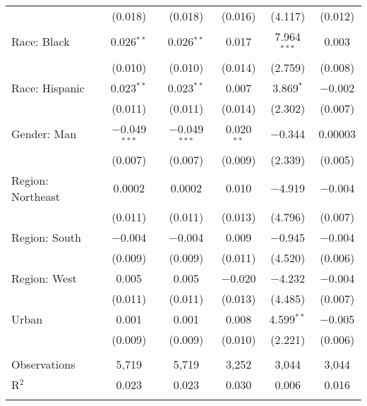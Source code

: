 \begin{tabular}{@{\extracolsep{5pt}}lccccc}
  & (0.018) & (0.018) & (0.016) & (4.117) & (0.012) \\ 
  Race: Black & 0.026$^{**}$ & 0.026$^{**}$ & 0.017 & 7.964$^{***}$ & 0.003 \\ 
  & (0.010) & (0.010) & (0.014) & (2.759) & (0.008) \\ 
  Race: Hispanic & 0.023$^{**}$ & 0.023$^{**}$ & 0.007 & 3.869$^{*}$ & $-$0.002 \\ 
  & (0.011) & (0.011) & (0.014) & (2.302) & (0.007) \\ 
  Gender: Man & $-$0.049$^{***}$ & $-$0.049$^{***}$ & 0.020$^{**}$ & $-$0.344 & 0.00003 \\ 
  & (0.007) & (0.007) & (0.009) & (2.339) & (0.005) \\ 
  Region: Northeast & 0.0002 & 0.0002 & 0.010 & $-$4.919 & $-$0.004 \\ 
  & (0.011) & (0.011) & (0.013) & (4.796) & (0.007) \\ 
  Region: South & $-$0.004 & $-$0.004 & 0.009 & $-$0.945 & $-$0.004 \\ 
  & (0.009) & (0.009) & (0.011) & (4.520) & (0.006) \\ 
  Region: West & 0.005 & 0.005 & $-$0.020 & $-$4.232 & $-$0.004 \\ 
  & (0.011) & (0.011) & (0.013) & (4.485) & (0.007) \\ 
  Urban & 0.001 & 0.001 & 0.008 & 4.599$^{**}$ & $-$0.005 \\ 
  & (0.009) & (0.009) & (0.010) & (2.221) & (0.006) \\ 
 \hline \\[-1.8ex] 

Observations & 5,719 & 5,719 & 3,252 & 3,044 & 3,044 \\ 
R$^{2}$ & 0.023 & 0.023 & 0.030 & 0.006 & 0.016 \\ 
\hline 
\hline \\[-1.8ex] 
\end{tabular} 